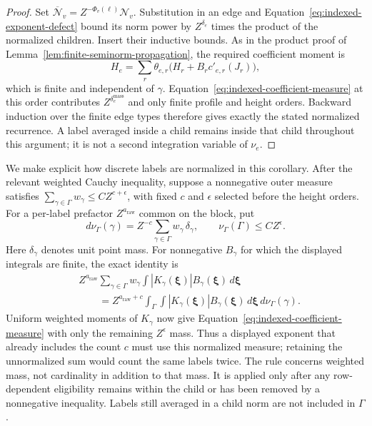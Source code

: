 \documentclass[11pt,a4paper]{article}
\numberwithin{equation}{section}
\numberwithin{figure}{section}
\theoremstyle{definition}
\theoremstyle{remark}
\begin{document}
\begin{proof}
Set $\overline{\mathcal N}_v=Z^{-\Phi_v(\boldsymbol\ell)}\mathcal N_v$.
Substitution in an edge and Equation~\eqref{eq:indexed-exponent-defect}
bound its norm power by $Z^{\delta_e}$ times the product of the normalized
children.  Insert their inductive bounds.  As in the product proof of
Lemma~\ref{lem:finite-seminorm-propagation}, the required coefficient moment
is
\[
 H_e=\sum_r\theta_{e,r}
              \bigl(H_r+B_r c'_{e,r}(J_r)\bigr),
\]
which is finite and independent of $\gamma$.  Equation~\eqref{eq:indexed-coefficient-measure}
at this order contributes $Z^{\delta_e^{\mathrm{mass}}}$ and only finite
profile and height orders.  Backward induction over the finite edge types
therefore gives exactly the stated normalized recurrence.  A label averaged
inside a child remains inside that child throughout this argument; it is
not a second integration variable of $\nu_e$.
\end{proof}

We make explicit how discrete labels are normalized in this corollary.  After
the relevant weighted Cauchy inequality, suppose a nonnegative outer measure
satisfies
$\sum_{\gamma\in\Gamma}w_\gamma\le C Z^{c+\epsilon}$, with fixed $c$ and
$\epsilon$ selected before the height orders.  For a per-label prefactor
$Z^{a_{\mathrm{raw}}}$ common on the block, put
\[
 d\nu_\Gamma(\gamma)=Z^{-c}
             \sum_{\gamma\in\Gamma}w_\gamma\,\delta_\gamma,
 \qquad \nu_\Gamma(\Gamma)\le C Z^\epsilon.
\]
Here $\delta_\gamma$ denotes unit point mass.  For nonnegative $B_\gamma$
for which the displayed integrals are finite, the exact identity is
\begin{equation}\label{eq:normalized-label-measure}
 \begin{split}
 &Z^{a_{\mathrm{raw}}}\sum_{\gamma\in\Gamma}w_\gamma
              \int |K_\gamma(\boldsymbol\xi)|B_\gamma(\boldsymbol\xi)
                                      \,d\boldsymbol\xi\\
 &\qquad=Z^{a_{\mathrm{raw}}+c}
       \int_\Gamma\int |K_\gamma(\boldsymbol\xi)|B_\gamma(\boldsymbol\xi)
                                      \,d\boldsymbol\xi\,d\nu_\Gamma(\gamma).
 \end{split}
\end{equation}
Uniform weighted moments of $K_\gamma$ now give
Equation~\eqref{eq:indexed-coefficient-measure} with only the remaining
$Z^\epsilon$ mass.  Thus a displayed exponent that already includes the
count $c$ must use this normalized measure; retaining the unnormalized sum
would count the same labels twice.  The rule concerns weighted mass, not
cardinality in addition to that mass.  It is applied only after any
row-dependent eligibility remains within the child or has been removed by a
nonnegative inequality.  Labels still averaged in a child norm are not
included in $\Gamma$.
\end{document}
